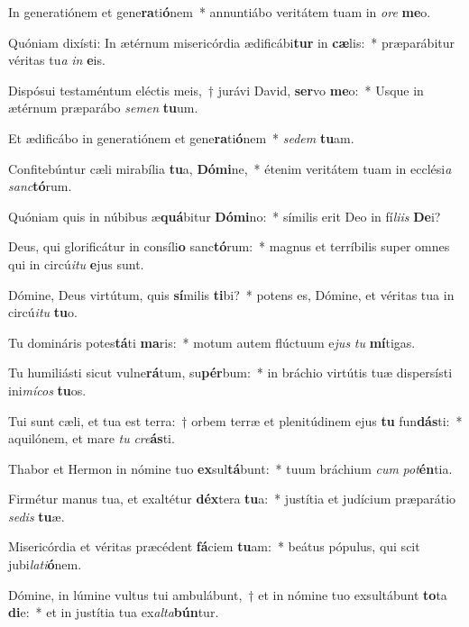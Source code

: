 \item In generatiónem et gene\textbf{ra}ti\textbf{ó}nem~* annuntiábo veritátem tuam in \textit{o}\textit{re} \textbf{me}o.
\item Quóniam dixísti: In ætérnum misericórdia ædificábi\textbf{tur} in \textbf{cæ}lis:~* præparábitur véritas tu\textit{a} \textit{in} \textbf{e}is.
\item Dispósui testaméntum eléctis meis,~† jurávi David, \textbf{ser}vo \textbf{me}o:~* Usque in ætérnum præparábo \textit{se}\textit{men} \textbf{tu}um.
\item Et ædificábo in generatiónem et gene\textbf{ra}ti\textbf{ó}nem~* \textit{se}\textit{dem} \textbf{tu}am.
\item Confitebúntur cæli mirabília \textbf{tu}a, \textbf{Dó}\textbf{mi}ne,~* étenim veritátem tuam in ecclési\textit{a} \textit{sanc}\textbf{tó}rum.
\item Quóniam quis in núbibus æ\textbf{quá}bitur \textbf{Dó}\textbf{mi}no:~* símilis erit Deo in fí\textit{li}\textit{is} \textbf{De}i?
\item Deus, qui glorificátur in consíli\textbf{o} sanc\textbf{tó}rum:~* magnus et terríbilis super omnes qui in circú\textit{i}\textit{tu} \textbf{e}jus sunt.
\item Dómine, Deus virtútum, quis \textbf{sí}milis \textbf{ti}bi?~* potens es, Dómine, et véritas tua in circú\textit{i}\textit{tu} \textbf{tu}o.
\item Tu domináris potes\textbf{tá}ti \textbf{ma}ris:~* motum autem flúctuum e\textit{jus} \textit{tu} \textbf{mí}tigas.
\item Tu humiliásti sicut vulne\textbf{rá}tum, su\textbf{pér}bum:~* in bráchio virtútis tuæ dispersísti ini\textit{mí}\textit{cos} \textbf{tu}os.
\item Tui sunt cæli, et tua est terra:~† orbem terræ et plenitúdinem ejus \textbf{tu} fun\textbf{dás}ti:~* aquilónem, et mare \textit{tu} \textit{cre}\textbf{ás}ti.
\item Thabor et Hermon in nómine tuo \textbf{ex}sul\textbf{tá}bunt:~* tuum bráchium \textit{cum} \textit{pot}\textbf{én}tia.
\item Firmétur manus tua, et exaltétur \textbf{déx}tera \textbf{tu}a:~* justítia et judícium præparátio \textit{se}\textit{dis} \textbf{tu}æ.
\item Misericórdia et véritas præcédent \textbf{fá}ciem \textbf{tu}am:~* beátus pópulus, qui scit jubi\textit{la}\textit{ti}\textbf{ó}nem.
\item Dómine, in lúmine vultus tui ambulábunt,~† et in nómine tuo exsultábunt \textbf{to}ta \textbf{di}e:~* et in justítia tua ex\textit{al}\textit{ta}\textbf{bún}tur.
